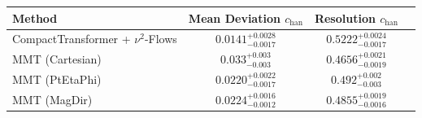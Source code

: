     \begin{tabular}{lccc}
        \toprule
        Method & Mean Deviation $c_{\text{han}}$ & Resolution $c_{\text{han}}$ \\
        \midrule
        CompactTransformer + $\nu^2$-Flows & $0.0141^{+0.0028}_{-0.0017}$ & $0.5222^{+0.0024}_{-0.0017}$ \\
        MMT (Cartesian) & $0.033^{+0.003}_{-0.003}$ & $0.4656^{+0.0021}_{-0.0019}$ \\
        MMT (PtEtaPhi) & $0.0220^{+0.0022}_{-0.0017}$ & $0.492^{+0.002}_{-0.003}$ \\
        MMT (MagDir) & $0.0224^{+0.0016}_{-0.0012}$ & $0.4855^{+0.0019}_{-0.0016}$ \\
        \bottomrule
    \end{tabular}